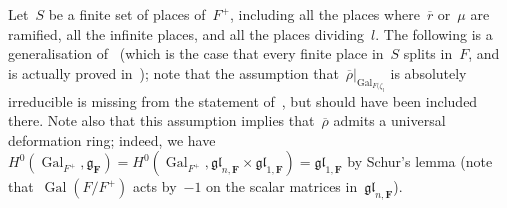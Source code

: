 \documentclass{amsart}
\renewcommand{\mathbb}{\mathbf}
\newcommand{\mubar}{\overline{\mu}}
\def\fg{\mathfrak{g}}
\def\fgl{\mathfrak{gl}}
\theoremstyle{definition}
\theoremstyle{remark}
\newcommand{\mar}[1]{}
\newcommand{\mar}[1]{\marginpar{\raggedright\tiny squirrel #1}}
\newcommand{\F}{\FF}
\newcommand{\FF}{{\mathbb F}}
\newcommand{\cG}{{\mathcal G}}
\DeclareMathOperator{\Gal}{Gal}
\newcommand{\rhobar}{\overline{\rho}}
\newcommand{\rbar}{\overline{r}}
\begin{document}


Let~$S$ be a finite set of places of~$F^+$, including all the places
where~$\rbar$ or~$\mu$ are ramified, all the infinite places, and all
the places dividing~$l$. The following is a generalisation
of~\cite[Prop.\ 1.5.1]{BLGGT} (which is the case that every finite
place in~$S$ splits in~$F$, and is actually proved in~\cite{CHT});
note that the assumption that~$\rhobar|_{\Gal_{F(\zeta_l}}$ is
absolutely irreducible is missing from the statement of~\cite[Prop.\
1.5.1]{BLGGT}, but should have been included there. %
Note also that this assumption implies
that~$\rhobar$ admits a universal deformation ring; indeed, we
have~$H^0(\Gal_{F^+},\fg_{\F})=H^0(\Gal_{F^+},\fgl_{n,\F}\times\fgl_{1,\F})=\fgl_{1,\F}$
by Schur's lemma (note that~$\Gal(F/F^+)$ acts by~$-1$ on the scalar
matrices in~$\fgl_{n,\F}$).
\end{document}

